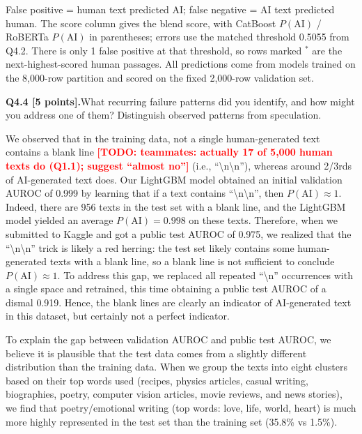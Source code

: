 \documentclass[11pt,letterpaper]{article}
\newcommand{\todo}[1]{\textcolor{red}{\textbf{[TODO: #1]}}}
\newcommand{\question}[2]{\needspace{4\baselineskip}\par\addvspace{0.45em}\noindent\textbf{#1}\quad #2\par\nobreak\vspace{0.1em}}
\newcommand{\smallnote}[1]{{\small\color{muted}#1}}
\begin{document}
\smallnote{False positive = human text predicted AI; false negative = AI text predicted human. The score column gives the blend score, with CatBoost $P(\text{AI})$ / RoBERTa $P(\text{AI})$ in parentheses; errors use the matched threshold 0.5055 from Q4.2. There is only 1 false positive at that threshold, so rows marked $^*$ are the next-highest-scored human passages. All predictions come from models trained on the 8,000-row partition and scored on the fixed 2,000-row validation set.}
\question{Q4.4 [5 points].}{What recurring failure patterns did you identify, and how might you address one of them? Distinguish observed patterns from speculation.}
We observed that in the training data, not a single human-generated text contains a blank line \todo{teammates: actually 17 of 5,000 human texts do (Q1.1); suggest ``almost no''} (i.e., ``\textbackslash n\textbackslash n''), whereas around 2/3rds of AI-generated text does. Our LightGBM model obtained an initial validation AUROC of 0.999 by learning that if a text contains ``\textbackslash n\textbackslash n'', then $P(\text{AI})\approx 1$. Indeed, there are 956 texts in the test set with a blank line, and the LightGBM model yielded an average $P(\text{AI})=0.998$ on these texts. Therefore, when we submitted to Kaggle and got a public test AUROC of 0.975, we realized that the ``\textbackslash n\textbackslash n'' trick is likely a red herring: the test set likely contains some human-generated texts with a blank line, so a blank line is not sufficient to conclude $P(\text{AI})\approx1$. To address this gap, we replaced all repeated ``\textbackslash n'' occurrences with a single space and retrained, this time obtaining a public test AUROC of a dismal 0.919. Hence, the blank lines are clearly an indicator of AI-generated text in this dataset, but certainly not a perfect indicator. 

\smallskip

To explain the gap between validation AUROC and public test AUROC, we believe it is plausible that the test data comes from a slightly different distribution than the training data. When we group the texts into eight clusters based on their top words used (recipes, physics articles, casual writing, biographies, poetry, computer vision articles, movie reviews, and news stories), we find that poetry/emotional writing (top words: love, life, world, heart) is much more highly represented in the test set than the training set (35.8\% vs 1.5\%).

\smallskip
\end{document}
